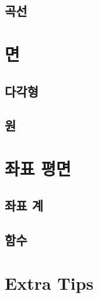 \documentclass[12pt]{beamer}
\begin{document}
\subsection{곡선}

\section{면}
\subsection{다각형}
\subsection{원}

\section{좌표 평면}
\subsection{좌표 계}
\subsection{함수}

\section{Extra Tips}
\end{document}
